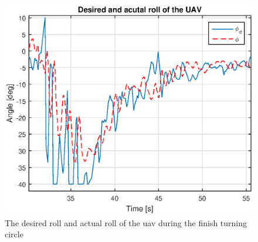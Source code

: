 \begin{figure}[H]
\centering
\includegraphics[scale=0.7]{figs/Experiment/rollDesired131844.eps}
\caption{The desired roll and actual roll of the \gls{uav} during the finish turning circle}
\label{Fig:DesiredRoll131844}
\end{figure}


